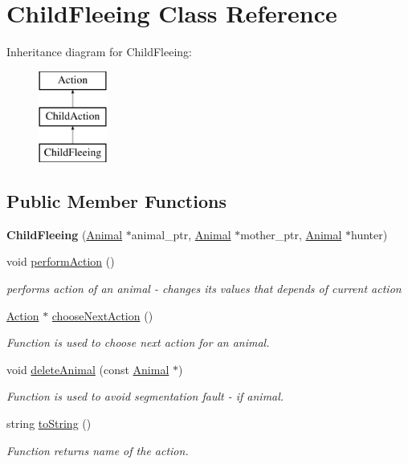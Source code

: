 \hypertarget{class_child_fleeing}{}\section{Child\+Fleeing Class Reference}
\label{class_child_fleeing}
Inheritance diagram for Child\+Fleeing\+:\begin{figure}[H]
\begin{center}
\leavevmode
\includegraphics[height=3.000000cm]{class_child_fleeing}
\end{center}
\end{figure}
\subsection*{Public Member Functions}
\begin{DoxyCompactItemize}
\item 
\hypertarget{class_child_fleeing_aab3b98e37f96eb6b7fddc8d57e519b3c}{}{\bfseries Child\+Fleeing} (\hyperlink{class_animal}{Animal} $\ast$animal\+\_\+ptr, \hyperlink{class_animal}{Animal} $\ast$mother\+\_\+ptr, \hyperlink{class_animal}{Animal} $\ast$hunter)\label{class_child_fleeing_aab3b98e37f96eb6b7fddc8d57e519b3c}

\item 
void \hyperlink{class_child_fleeing_a9d2303d3aa71501e99c96aac579fbf59}{perform\+Action} ()
\begin{DoxyCompactList}\small\item\em performs action of an animal -\/ changes it\textquotesingle{}s values that depends of current action \end{DoxyCompactList}\item 
\hyperlink{class_action}{Action} $\ast$ \hyperlink{class_child_fleeing_a4be1b2a301b82cbfc6564f77e950e3fd}{choose\+Next\+Action} ()
\begin{DoxyCompactList}\small\item\em Function is used to choose next action for an animal. \end{DoxyCompactList}\item 
void \hyperlink{class_child_fleeing_a57d77a6418b9b1a0b3fd6d1532e2b353}{delete\+Animal} (const \hyperlink{class_animal}{Animal} $\ast$)
\begin{DoxyCompactList}\small\item\em Function is used to avoid segmentation fault -\/ if animal. \end{DoxyCompactList}\item 
string \hyperlink{class_child_fleeing_a3bc6767ccf4f3783217db650e3002502}{to\+String} ()
\begin{DoxyCompactList}\small\item\em Function returns name of the action. \end{DoxyCompactList}\end{DoxyCompactItemize}
